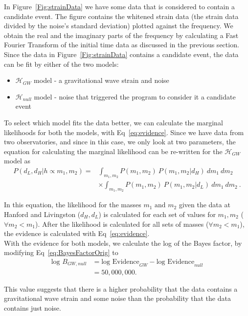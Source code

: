 \documentclass{article}
\makeatletter
\newcommand\mynobreakpar{\par\nobreak\@afterheading}
\makeatother
\begin{document}
 
 In Figure~\ref{Fig:strainData} we have some data that is considered to contain a candidate event. The figure contains the whitened strain data (the strain data divided by the noise's standard deviation) plotted against the frequency. We obtain the real and the imaginary parts of the frequency by calculating a Fast Fourier Transform of the initial time data as discussed in the previous section.\\
 
 Since the data in Figure~\ref{Fig:strainData} contains a candidate event, the data can be fit by either of the two models:  \mynobreakpar
 \begin{itemize}
 	\item $\mathcal{H}_{GW}$ model - a gravitational wave strain and noise \mynobreakpar
 	\item $\mathcal{H}_{null}$ model - noise that triggered the program to consider it a candidate event
 \end{itemize}
 
 To select which model fits the data better, we can calculate the marginal likelihoods for both the models, with Eq~\ref{eq:evidence}. Since we have data from two observatories, and since in this case, we only look at two parameters, the equation for calculating the marginal likelihood can be re-written for the $\mathcal{H}_{GW}$ model as 
 \begin{align*}
 	P(d_L,d_H | h\propto m_1, m_2) = & \int_{m_1, m_2} { P(m_1,m_2) \ P(m_1,m_2 | d_H)\ dm_1\ dm_2 } \\
 	& \times \int_{m_1, m_2} { P(m_1,m_2) \ P(m_1,m_2 | d_L)\ dm_1\ dm_2 } \ .
 \end{align*}
 
 
 In this equation, the likelihood for the masses $m_1 \text{ and } m_2$ given the data at Hanford and Livingston ($d_H, d_L$) is calculated for each set of values for $m_1,m_2$ ($\forall m_2 < m_1$). After the likelihood is calculated for all sets of masses ($\forall m_2 < m_1$), the evidence is calculated with Eq~\ref{eq:evidence}.\\
 
 
 With the evidence for both models, we calculate the log of the Bayes factor, by modifying Eq~\ref{eq:BayesFactorOrig} to 
 \begin{align*}
\text{log }B_{GW,null} &= \text{log Evidence}_{GW} - \text{log Evidence}_{null} \\
&= 50,000,000.
 \end{align*}
 
  This value suggests that there is a higher probability that the data contains a gravitational wave strain and some noise than the probability that the data contains just noise.\\ 
 
\end{document}
